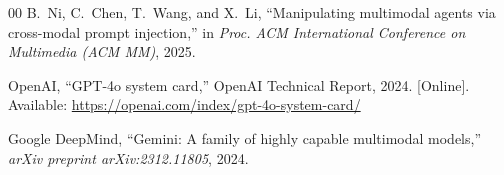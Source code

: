 \documentclass[conference]{IEEEtran}
\begin{document}
\begin{thebibliography}{00}
B.~Ni, C.~Chen, T.~Wang, and X.~Li, ``Manipulating multimodal agents via cross-modal prompt injection,'' in \textit{Proc. ACM International Conference on Multimedia (ACM MM)}, 2025.

OpenAI, ``GPT-4o system card,'' OpenAI Technical Report, 2024. [Online]. Available: \url{https://openai.com/index/gpt-4o-system-card/}

Google DeepMind, ``Gemini: A family of highly capable multimodal models,'' \textit{arXiv preprint arXiv:2312.11805}, 2024.

\end{thebibliography}
\end{document}
